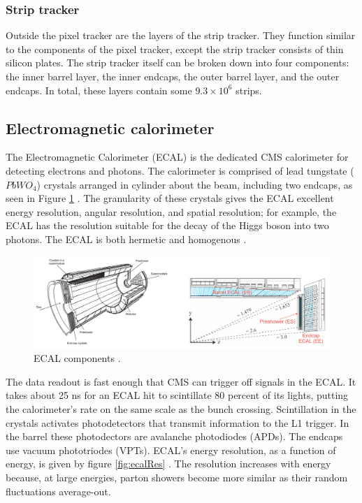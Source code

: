 \subsubsection{Strip tracker}

Outside the pixel tracker are the layers of the strip tracker. They function similar to the components of the pixel tracker, except the strip tracker consists of thin silicon plates. The strip tracker itself can be broken down into four components: the inner barrel layer, the inner endcaps, the outer barrel layer, and the outer endcaps. In total, these layers contain some $9.3 \times 10^6$ strips. 

\subsection{Electromagnetic calorimeter}

The Electromagnetic Calorimeter (ECAL) is the dedicated CMS calorimeter for detecting electrons and photons. The calorimeter is comprised of lead tungstate ($PbWO_4$) crystals arranged in cylinder about the beam, including two endcaps, as seen in Figure \ref{fig:ecalComp} \cite{Benaglia:2014aqa}. The granularity of these crystals gives the ECAL excellent energy resolution, angular resolution, and spatial resolution; for example, the ECAL has the resolution suitable for the decay of the Higgs boson into two photons. The ECAL is both hermetic and homogenous \cite{elect_cms_note06}. 

\begin{figure}[]
\begin{centering}
\includegraphics[width=7in]{Chapter3/importfigs/ecal_performance_with_examples.png}
\par\end{centering}
\caption{ECAL components \cite{Benaglia:2014aqa}. \label{fig:ecalComp}}
\end{figure}

The data readout is fast enough that CMS can trigger off signals in the ECAL. It takes about 25 ns for an ECAL hit to scintillate 80 percent of its lights, putting the calorimeter's rate on the same scale as the bunch crossing. Scintillation in the crystals activates photodetectors that transmit information to the L1 trigger. In the barrel these photodectors are avalanche photodiodes (APDs). The endcaps use vacuum phototriodes (VPTs). ECAL's energy resolution, as a function of energy, is given by figure \ref{fig:ecalRes} \cite{Bayatian:2006nff}. The resolution increases with energy because, at large energies, parton showers become more similar as their random fluctuations average-out.

